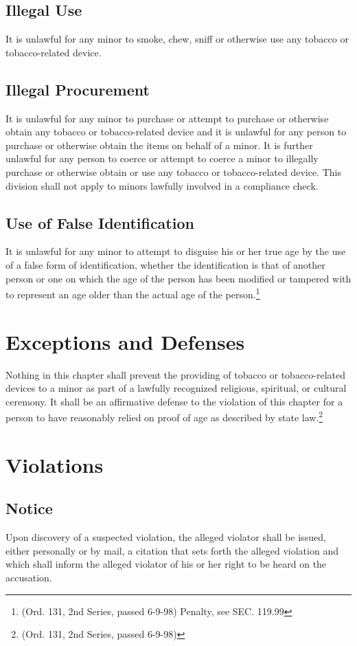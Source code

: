 \subsection{Illegal Use}
It is unlawful for any minor to smoke, chew, sniff or otherwise use any tobacco or tobacco-related device.
\subsection{Illegal Procurement}
It is unlawful for any minor to purchase or attempt to purchase or otherwise obtain any tobacco or tobacco-related device and it is unlawful for any person to purchase or otherwise obtain the items on behalf of a minor.  It is further unlawful for any person to coerce or attempt to coerce a minor to illegally purchase or otherwise obtain or use any tobacco or tobacco-related device.  This division shall not apply to minors lawfully involved in a compliance check.
\subsection{Use of False Identification}
It is unlawful for any minor to attempt to disguise his or her true age by the use of a false form of identification, whether the identification is that of another person or one on which the age of the person has been modified or tampered with to represent an age older than the actual age of the person.\footnote{(Ord. 131, 2nd Series, passed 6-9-98)  Penalty, see SEC. 119.99}

\section{Exceptions and Defenses}
Nothing in this chapter shall prevent the providing of tobacco or tobacco-related devices to a minor as part of a lawfully recognized religious, spiritual, or cultural ceremony.  It shall be an affirmative defense to the violation of this chapter for a person to have reasonably relied on proof of age as described by state law.\footnote{(Ord. 131, 2nd Series, passed 6-9-98)}

\section{Violations}
\subsection{Notice}
Upon discovery of a suspected violation, the alleged violator shall be issued, either personally or by mail, a citation that sets forth the alleged violation and which shall inform the alleged violator of his or her right to be heard on the accusation.
